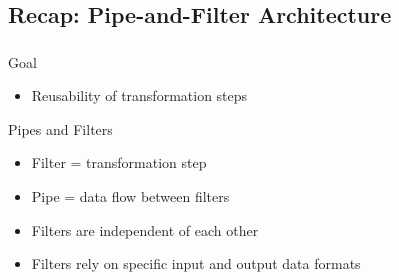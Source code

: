 \subsection{Recap: Pipe-and-Filter Architecture}

\begin{frame}
    \frametitle{\insertsubsection{}}
    \begin{fancycolumns}[widths={45,55}]
        \begin{motivation}{Goal}
            \begin{itemize}
                \item Reusability of transformation steps
            \end{itemize}
        \end{motivation}
        \begin{definition}{Pipes and Filters}
            \begin{itemize}
                \item Filter = transformation step
                \item Pipe = data flow between filters
                \item Filters are independent of each other
                \item Filters rely on specific input and output data formats
            \end{itemize}
        \end{definition}
        \nextcolumn
        \pipesfiltersdefault{}
    \end{fancycolumns}
\end{frame}


